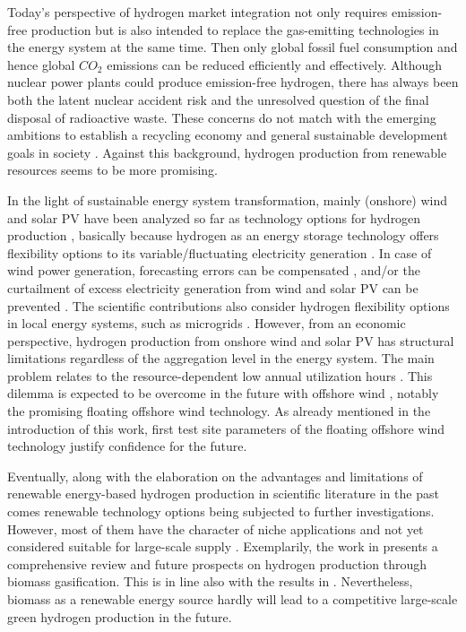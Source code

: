 \documentclass[review]{elsarticle}
\begin{document}
Today's perspective of hydrogen market integration not only requires emission-free production but is also intended to replace the gas-emitting technologies in the energy system at the same time. Then only global fossil fuel consumption \cite{midilli2008hydrogen} and hence global $CO_2$ emissions can be reduced efficiently and effectively. Although nuclear power plants could produce emission-free hydrogen, there has always been both the latent nuclear accident risk and the unresolved question of the final disposal of radioactive waste. These concerns do not match with the emerging ambitions to establish a recycling economy and general sustainable development goals in society \cite{sdg2018sustainable}. Against this background, hydrogen production from renewable resources seems to be more promising.\vspace{0.3cm} 

In the light of sustainable energy system transformation, mainly (onshore) wind and solar PV have been analyzed so far as technology options for hydrogen production \cite{nematollahi2019techno}, basically because hydrogen as an energy storage technology offers flexibility options to its variable/fluctuating electricity generation \cite{mcpherson2018role}. In case of wind power generation, forecasting errors can be compensated \cite{kroniger2014hydrogen}, and/or the curtailment of excess electricity generation from wind \cite{mcdonagh2020hydrogen} and solar PV \cite{wu2020investment} can be prevented \cite{mcdonagh2019electrofuels}. The scientific contributions also consider hydrogen flexibility options in local energy systems, such as microgrids \cite{li2021multiple, bornapour2017optimal, li2017sizing}. However, from an economic perspective, hydrogen production from onshore wind and solar PV has structural limitations regardless of the aggregation level in the energy system. The main problem relates to the resource-dependent low annual utilization hours \cite{moraes2018comparison, ajanovic2018economic}. This dilemma is expected to be overcome in the future with offshore wind \cite{leahy2020development, mcdonagh2020hydrogen}, notably the promising floating offshore wind technology. As already mentioned in the introduction of this work, first test site parameters of the floating offshore wind technology justify confidence for the future.\vspace{0.3cm}

Eventually, along with the elaboration on the advantages and limitations of renewable energy-based hydrogen production in scientific literature in the past comes renewable technology options being subjected to further investigations. However, most of them have the character of niche applications and not yet considered suitable for large-scale supply \cite{glenk2019economics}. Exemplarily, the work in \cite{cao2020biorenewable} presents a comprehensive review and future prospects on hydrogen production through biomass gasification. This is in line also with the results in \cite{kelly2007potential}. Nevertheless, biomass as a renewable energy source hardly will lead to a competitive large-scale green hydrogen production in the future.\vspace{0.3cm}
\end{document}
